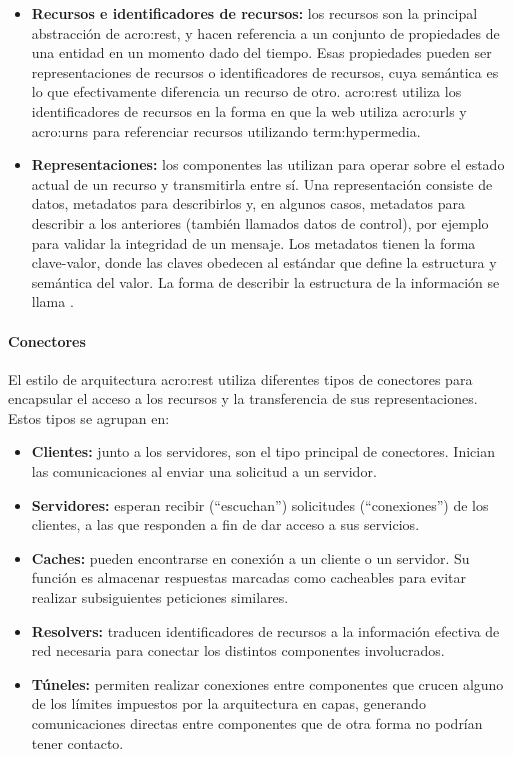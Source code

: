 \begin{itemize}
  \item \textbf{Recursos e identificadores de recursos:} los recursos son la principal abstracción de \gls{acro:rest}, y hacen referencia a un conjunto de propiedades de una entidad en un momento dado del tiempo. Esas propiedades pueden ser representaciones de recursos o identificadores de recursos, cuya semántica es lo que efectivamente diferencia un recurso de otro. \gls{acro:rest} utiliza los identificadores de recursos en la forma en que la web utiliza \glspl{acro:url} y \glspl{acro:urn} para referenciar recursos utilizando \gls{term:hypermedia}.

  \item \textbf{Representaciones:} los componentes las utilizan para operar sobre el estado actual de un recurso y transmitirla entre sí. Una representación consiste de datos, metadatos para describirlos y, en algunos casos, metadatos para describir a los anteriores (también llamados datos de control), por ejemplo para validar la integridad de un mensaje. Los metadatos tienen la forma clave-valor, donde las claves obedecen al estándar que define la estructura y semántica del valor. La forma de describir la estructura de la información se llama .
\end{itemize}


\paragraph{Conectores}

El estilo de arquitectura \gls{acro:rest} utiliza diferentes tipos de conectores para encapsular el acceso a los recursos y la transferencia de sus representaciones. Estos tipos se agrupan en:

\begin{itemize}
  \item \textbf{Clientes:} junto a los servidores, son el tipo principal de conectores. Inician las comunicaciones al enviar una solicitud a un servidor.

  \item \textbf{Servidores:} esperan recibir (``escuchan'') solicitudes (``conexiones'') de los clientes, a las que responden a fin de dar acceso a sus servicios.

  \item \textbf{Caches:} pueden encontrarse en conexión a un cliente o un servidor. Su función es almacenar respuestas marcadas como cacheables para evitar realizar subsiguientes peticiones similares.

  \item \textbf{Resolvers:} traducen identificadores de recursos a la información efectiva de red necesaria para conectar los distintos componentes involucrados.

  \item \textbf{Túneles:} permiten realizar conexiones entre componentes que crucen alguno de los límites impuestos por la arquitectura en capas, generando comunicaciones directas entre componentes que de otra forma no podrían tener contacto.
\end{itemize}

